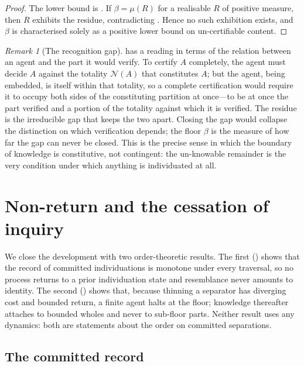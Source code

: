 \documentclass[11pt,a4paper]{article}
\theoremstyle{thmstyle}
\theoremstyle{definition}
\theoremstyle{remark}
\newtheorem{remark}[theorem]{Remark}
\newcommand{\thick}{\beta}
\newcommand{\Neg}{\mathcal{N}}
\begin{document}
\begin{proof}
The lower bound is . If $\thick=\mu(R)$ for a realisable $R$
of positive measure, then $R$ exhibits the residue, contradicting
. Hence no such exhibition exists, and $\thick$ is
characterised solely as a positive lower bound on un-certifiable content.
\end{proof}

\begin{remark}[The recognition gap]
\label{rem:recognition-gap}
 has a reading in terms of the relation between an
agent and the part it would verify. To certify $A$ completely, the agent must
decide $A$ against the totality $\Neg(A)$ that constitutes $A$; but the agent,
being embedded, is itself within that totality, so a complete certification would
require it to occupy both sides of the constituting partition at once---to be at
once the part verified and a portion of the totality against which it is
verified. The residue is the irreducible gap that keeps the two apart. Closing
the gap would collapse the distinction on which verification depends; the floor
$\thick$ is the measure of how far the gap can never be closed. This is the
precise sense in which the boundary of knowledge is constitutive, not contingent:
the un-knowable remainder is the very condition under which anything is
individuated at all.
\end{remark}


\section{Non-return and the cessation of inquiry}
\label{sec:inquiry}

We close the development with two order-theoretic results. The first
() shows that the record of committed individuations is
monotone under every traversal, so no process returns to a prior individuation
state and resemblance never amounts to identity. The second
() shows that, because thinning a separator has diverging
cost and bounded return, a finite agent halts at the floor; knowledge thereafter
attaches to bounded wholes and never to sub-floor parts. Neither result uses any
dynamics: both are statements about the order on committed separations.

\subsection{The committed record}
\end{document}
